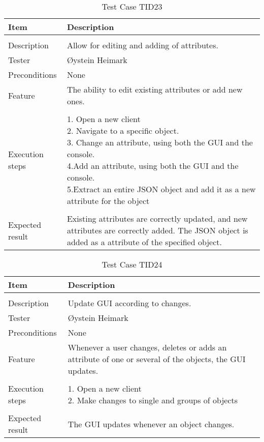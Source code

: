\begin{table}
\caption{Test Case TID23}
\centering
\begin{tabular}{ l p{13cm} }
\hline 
 Item            & Description        \\ 
\hline \\ [-2.0ex]
 Description     &Allow for editing and adding of attributes. \\ 
 Tester          & Øystein Heimark                  \\ 
 Preconditions   & None\\ 
 Feature         & The ability to edit existing attributes or add new ones.   \vspace{3pt}                     \\ 
\hline \\ [-1.5ex]
 Execution steps & \pbox{13cm}{1. Open a new client \\ 2. Navigate to a specific object. \\ 3. Change an attribute, using both the GUI and the console. \\ 4.Add an attribute, using both the GUI and the console. \\ 5.Extract an entire JSON object and add it as a new attribute for the object } \vspace{3pt} \\
\hline \\ [-1.5ex]
 Expected result & Existing attributes are correctly updated, and new attributes are correctly added. The JSON object is added as a attribute of the specified object. \\
\hline 
\end{tabular}
\label{table:testcasetid23}
\end{table}


\begin{table}
\caption{Test Case TID24}
\centering
\begin{tabular}{ l p{13cm} }
\hline 
 Item            & Description        \\ 
\hline \\ [-2.0ex]
 Description     &Update GUI according to changes. \\ 
 Tester          & Øystein Heimark                  \\ 
 Preconditions   & None\\ 
 Feature         & Whenever a user changes, deletes or adds an attribute of one or several of the objects, the GUI updates.   \vspace{3pt}                     \\ 
\hline \\ [-1.5ex]
 Execution steps & \pbox{13cm}{1. Open a new client \\ 2. Make changes to single and groups of objects} \vspace{3pt} \\
\hline \\ [-1.5ex]
 Expected result & The GUI updates whenever an object changes. \\
\hline 
\end{tabular}
\label{table:testcasetid24}
\end{table}

